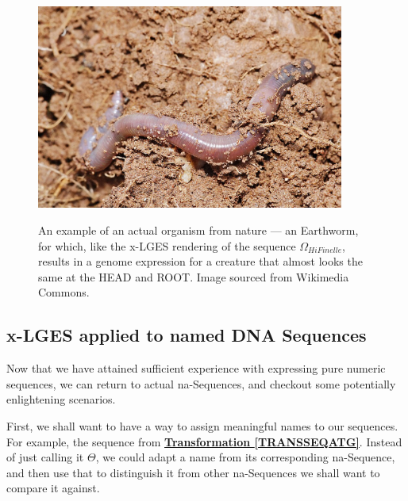 \documentclass[a4paper, 18pt]{book} %
\begin{document}
\begin{figure}[H]
  \begin{center}
   \includegraphics[trim=0cm 0cm 0cm 0cm, clip, width=0.9\textwidth,]{resources/images/Earthworm.jpg}\\
   \caption{An example of an actual organism from nature --- an Earthworm, for which, like the x-LGES rendering of the sequence $\Omega_{HiFinelle}$, results in a genome expression for a creature that almost looks the same at the HEAD and ROOT. Image sourced from Wikimedia Commons\cite{earthwormImage}.}
  \label{FIGEARTHWORM}
  \end{center}
\end{figure}





\subsection{x-LGES applied to named DNA Sequences}

Now that we have attained sufficient experience with expressing pure numeric sequences, we can return to actual na-Sequences, and checkout some potentially enlightening scenarios.

First, we shall want to have a way to assign meaningful names to our sequences. For example, the sequence from \textbf{\hyperref[TRANSSEQATG]{Transformation \ref{TRANSSEQATG}}}. Instead of just calling it $\Theta$, we could adapt a name from its corresponding na-Sequence, and then use that to distinguish it from other na-Sequences we shall want to compare it against.
\end{document}

